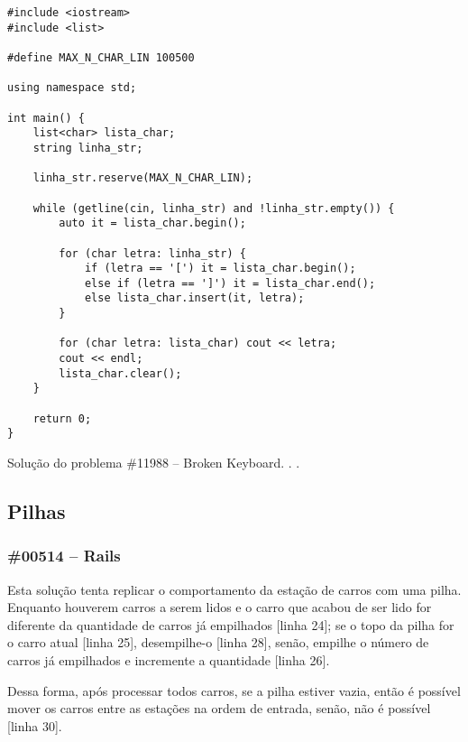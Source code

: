 \documentclass[a4paper,12pt]{scrartcl}
\begin{document}
\begin{listing}[H]
\begin{verbatim}
#include <iostream>
#include <list>

#define MAX_N_CHAR_LIN 100500

using namespace std;

int main() {
    list<char> lista_char;
    string linha_str;

    linha_str.reserve(MAX_N_CHAR_LIN);

    while (getline(cin, linha_str) and !linha_str.empty()) {
        auto it = lista_char.begin();

        for (char letra: linha_str) {
            if (letra == '[') it = lista_char.begin();
            else if (letra == ']') it = lista_char.end();
            else lista_char.insert(it, letra);
        }

        for (char letra: lista_char) cout << letra;
        cout << endl;
        lista_char.clear();
    }

    return 0;
}
\end{verbatim}
\caption{\footnotesize{Solução do problema \#11988 – Broken Keyboard. . .}}
\end{listing}

\subsection{Pilhas}
\subsubsection{\#00514 – Rails}
Esta solução tenta replicar o comportamento da estação de carros com uma pilha. Enquanto houverem carros a serem lidos e o carro que acabou de ser lido for diferente da quantidade de carros já empilhados [linha 24]; se o topo da pilha for o carro atual [linha 25], desempilhe-o [linha 28], senão, empilhe o número de carros já empilhados e incremente a quantidade [linha 26].

Dessa forma, após processar todos carros, se a pilha estiver vazia, então é possível mover os carros entre as estações na ordem de entrada, senão, não é possível [linha 30].
\end{document}
